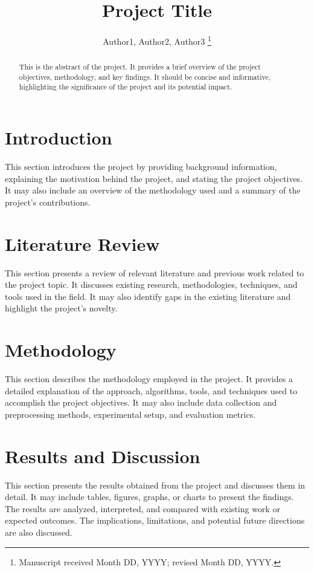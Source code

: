 \documentclass[journal]{IEEEtran}
\title{Project Title}
\author{Author1, Author2, Author3%
	\thanks{Manuscript received Month DD, YYYY; revised Month DD, YYYY.}}
\begin{document}
	
	\maketitle
	
	\begin{abstract}
		This is the abstract of the project. It provides a brief overview of the project objectives, methodology, and key findings. It should be concise and informative, highlighting the significance of the project and its potential impact.
	\end{abstract}
	
	\section{Introduction}
	\label{sec:introduction}
	This section introduces the project by providing background information, explaining the motivation behind the project, and stating the project objectives. It may also include an overview of the methodology used and a summary of the project's contributions.
	
	\section{Literature Review}
	\label{sec:literature_review}
	This section presents a review of relevant literature and previous work related to the project topic. It discusses existing research, methodologies, techniques, and tools used in the field. It may also identify gaps in the existing literature and highlight the project's novelty.
	
	\section{Methodology}
	\label{sec:methodology}
	This section describes the methodology employed in the project. It provides a detailed explanation of the approach, algorithms, tools, and techniques used to accomplish the project objectives. It may also include data collection and preprocessing methods, experimental setup, and evaluation metrics.
	
	\section{Results and Discussion}
	\label{sec:results_discussion}
	This section presents the results obtained from the project and discusses them in detail. It may include tables, figures, graphs, or charts to present the findings. The results are analyzed, interpreted, and compared with existing work or expected outcomes. The implications, limitations, and potential future directions are also discussed.
	
\end{document}
